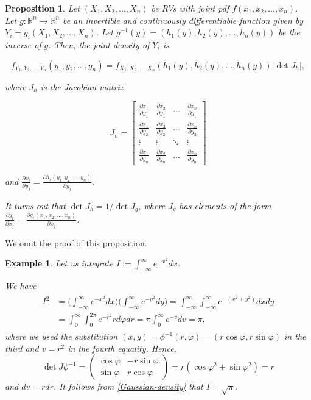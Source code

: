 \documentclass{book}
\theoremstyle{plain}%
\newtheorem{prototheorem}{Example}[section]
\newenvironment{cexample}
   {\colorlet{shadecolor}{gray!10}\begin{shaded}\begin{prototheorem}}
   {\end{prototheorem}\end{shaded}}
\newtheorem{proposition}{Proposition}[section]
\theoremstyle{definition}
\newlength{\arrow}
\newcommand{\pder}[2]{\frac{\partial #1}{\partial #2}}
\begin{document}
\begin{proposition}
Let $(X_1,X_2,...,X_n)$ be RVs with joint pdf $f(x_1,x_2,...,x_n)$. Let $g: \mathbb{R}^n \rightarrow \mathbb{R}^n$ be an invertible and continuously differentiable function given by $Y_i = g_i(X_1, X_2, ..., X_n)$. Let $g^{-1}(y) = (h_1(y), h_2(y),..., h_n(y))$ be the inverse of $g$. Then, the joint density of $Y_i$ is

$$f_{Y_1,Y_2,...,Y_n}(y_1,y_2,...,y_n) = f_{X_1,X_2,...,X_n}(h_1(y), h_2(y),..., h_n(y))|\det J_h|,$$

where $J_h$ is the Jacobian matrix

$$J_h = \begin{bmatrix}
\pder{x_1}{y_1} & \pder{x_2}{y_1} & \dots & \pder{x_n}{y_1} \\[1ex]
\pder{x_1}{y_2} & \pder{x_2}{y_2} & \dots & \pder{x_n}{y_2} \\
\vdots & \vdots & \ddots & \vdots \\[1ex]
\pder{x_1}{y_n} & \pder{x_2}{y_n} & \dots & \pder{x_n}{y_n}
\end{bmatrix}$$

and $\pder{x_i}{y_j} = \pder{h_i(y_1,y_2,...,y_n)}{y_j}.$

It turns out that $\det J_h = 1/\det J_g$, where $J_g$ has elements of the form $\pder{y_i}{x_j} = \pder{g_i(x_1,x_2,...,x_n)}{x_j}$.\label{prop:changeofvar}
\end{proposition}

We omit the proof of this proposition.


\begin{cexample}

Let us integrate $I:=\int_{-\infty}^{\infty}e^{-x^2}dx$.

We have
    \begin{align}
    \label{Gaussian-density}
    \begin{split}
        I^2
        &=
        \Big(\int_{-\infty}^{\infty}e^{-x^2}dx\Big)
        \Big(\int_{-\infty}^{\infty}e^{-y^2}dy\Big)
        =
        \int_{-\infty}^{\infty}\int_{-\infty}^{\infty}
            e^{-(x^2+y^2)}dxdy\\
        &=
            \int_{0}^{\infty}\int_{0}^{2\pi}
            e^{-r^2}rd\varphi dr
        =\pi \int_{0}^{\infty}e^{-v}dv
        =\pi, 
    \end{split}
    \end{align}
    where we used the substitution 
    $(x,y)=\phi^{-1}(r,\varphi)=(r\cos\varphi,r\sin\varphi)$
    in the third and $v=r^2$ in the fourth equality.
    Hence, 
    $$
    \det J\phi^{-1}
    =
    \begin{pmatrix}
        \cos\varphi & -r\sin\varphi\\
        \sin\varphi & r\cos\varphi
    \end{pmatrix}
    =
    r(\cos\varphi^2+\sin\varphi^2)=r
    $$
    and $dv=rdr$.
    It follows from \eqref{Gaussian-density} that $I=\sqrt{\pi}.$
\end{cexample}
\end{document}
